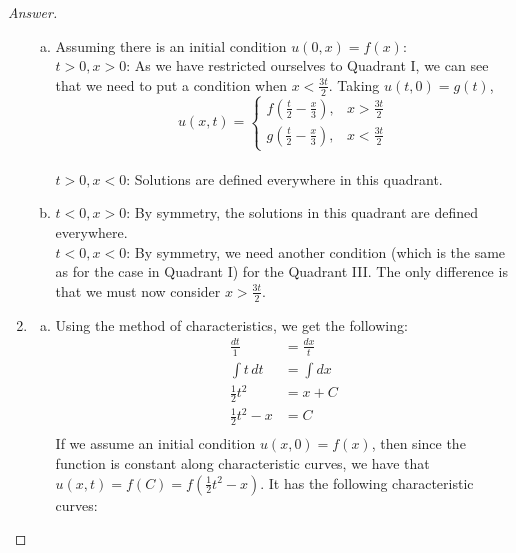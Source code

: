 \documentclass{article}
\theoremstyle{definition}
\renewcommand\qedsymbol{$\blacksquare$}
\newenvironment{ans}{\begin{proof}[Answer]\renewcommand{\qedsymbol}{}}{\end{proof}}
\begin{document}
\begin{ans}
\begin{enumerate}[(1), series=answers]
\begin{enumerate}[a)]
                    \item Assuming there is an initial condition $u(0,x) = f(x)$:\\
                    \underline{$t > 0, x > 0$}: As we have restricted ourselves to Quadrant I, we can see that we need to put a condition when $x < \frac{3t}{2}$. Taking $u(t,0) = g(t)$, 
                    \begin{equation*}
                    u(x,t) =
                    \begin{cases}
                        f\left(\frac{t}{2}-\frac{x}{3}\right), & x > \frac{3t}{2}\\
                        g\left(\frac{t}{2}-\frac{x}{3}\right), & x < \frac{3t}{2}
                    \end{cases}
                    \end{equation*}\\
                    \underline{$t > 0, x < 0$}: Solutions are defined everywhere in this quadrant.

                    \item \underline{$t < 0, x > 0$}: By symmetry, the solutions in this quadrant are defined everywhere.\\
                    \underline{$t < 0, x < 0$}: By symmetry, we need another condition (which is the same as for the case in Quadrant I) for the Quadrant III. The only difference is that we must now consider $x > \frac{3t}{2}$.
                \end{enumerate}
			
			\item \begin{enumerate}[a)]
                    \item Using the method of characteristics, we get the following:
                    \begin{align*}
                        \frac{dt}{1} &= \frac{dx}{t}\\
                        \int t\,dt &= \int dx\\
                        \frac{1}{2}t^2 &= x+C\\
                        \frac{1}{2}t^2 -x &= C\\
                    \end{align*}
                    If we assume an initial condition $u(x,0) = f(x)$, then since the function is constant along characteristic curves, we have that $\boxed{u(x,t) = f(C) = f\left(\frac{1}{2}t^2 - x\right)}$. It has the following characteristic curves:
                    

\end{enumerate}
\end{enumerate}
\end{ans}
\end{document}

